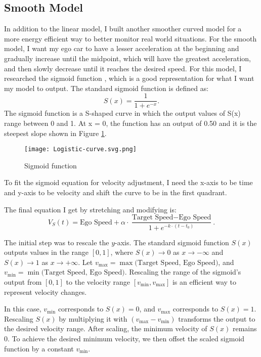 \documentclass[12pt]{article}
\begin{document}
\subsection*{Smooth Model}

\indent In addition to the linear model, I built another smoother curved model for a more energy efficient way to better monitor real world situations. For the smooth model, I want my ego car to have a lesser acceleration at the beginning and gradually increase until the midpoint, which will have the greatest acceleration, and then slowly decrease until it reaches the desired speed. For this model, I researched the sigmoid function \cite{sigmoid_function_sciencedirect}, which is a good representation for what I want my model to output.
The standard sigmoid function is defined as:
\[
S(x) = \frac{1}{1 + e^{-x}}.
\]
The sigmoid function is a S-shaped curve in which the output values of S(x) range between 0 and 1. At x = 0, the function has an output of 0.50 and it is the steepest slope shown in Figure \ref{fig:Sigmoid}.

\begin{figure}[h!]  %
\centering
\texttt{[image: Logistic-curve.svg.png]}  %
\caption{Sigmoid function}
\label{fig:Sigmoid}
\end{figure}

To fit the sigmoid equation for velocity adjustment, I need the x-axis to be time and y-axis to be velocity and shift the curve to be in the first quadrant. 

\noindent The final equation I get by stretching and modifying is: 
\begin{equation}
V_S(t) = \text{Ego Speed} + \alpha \cdot \frac{\text{Target Speed} - \text{Ego Speed}}{1 + e^{-k \cdot (t - t_0)}}.
\label{eq:velocity_s}
\end{equation}

The initial step was to rescale the \( y \)-axis. The standard sigmoid function \( S(x) \) outputs values in the range \([0,1]\), where \( S(x) \to 0 \) as \( x \to -\infty \) and \( S(x) \to 1 \) as \( x \to +\infty \). Let \(v_{\max} = \max(\text{Target Speed, Ego Speed)}\), and \(v_{\min} = \min(\text{Target Speed, Ego Speed)}\). Rescaling the range of the sigmoid's output from \([0,1]\) to the velocity range \([v_{\min}, v_{\max}]\) is an efficient way to represent velocity changes.

In this case, \( v_{\min} \) corresponds to \( S(x) = 0 \), and \( v_{\max} \) corresponds to \( S(x) = 1 \). Rescaling \( S(x) \) by multiplying it with \((v_{\max} - v_{\min})\) transforms the output to the desired velocity range. After scaling, the minimum velocity of \( S(x) \) remains 0. To achieve the desired minimum velocity, we then offset the scaled sigmoid function by a constant \( v_{\min} \).
\end{document}

